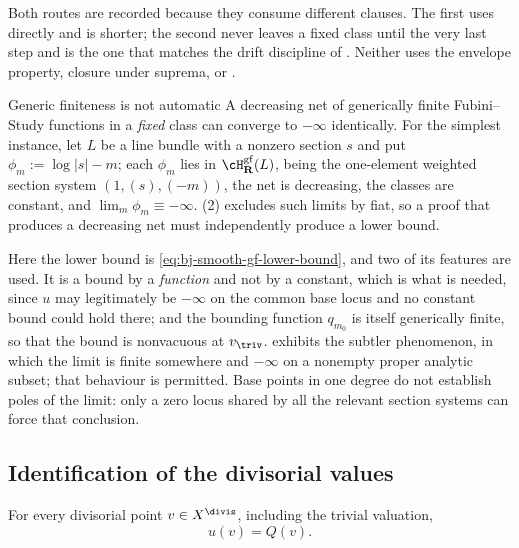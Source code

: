 Both routes are recorded because they consume different clauses.  The first
uses  directly and is shorter; the second never leaves a
fixed class until the very last step and is the one that matches the drift
discipline of .  Neither uses the
envelope property, closure under suprema, or
.

\begin{warning}{Generic finiteness is not automatic}
\label{warn:ch40-generic-finiteness}
A decreasing net of generically finite Fubini--Study functions in a
\emph{fixed} class can converge to $-\infty$ identically.  For the
simplest instance, let $L$ be a line bundle with a nonzero section $s$
and put $\phi_m:=\log|s|-m$; each $\phi_m$ lies in
$\cH^{\mathrm{gf}}_{\mathbf R}(L)$, being the one-element weighted section
system $(1,(s),(-m))$, the net is decreasing, the classes are constant, and
$\lim_m\phi_m\equiv-\infty$.  (2) excludes such limits by
fiat, so a proof that produces a decreasing net must independently produce a
lower bound.

Here the lower bound is \eqref{eq:bj-smooth-gf-lower-bound}, and two of its
features are used.  It is a bound by a \emph{function} and not by a
constant, which is what is needed, since $u$ may legitimately be
$-\infty$ on the common base locus and no constant bound could hold there;
and the bounding function $q_{m_0}$ is itself generically finite, so that
the bound is nonvacuous at $v_{\triv}$.  
exhibits the subtler phenomenon, in which the limit is finite somewhere and
$-\infty$ on a nonempty proper analytic subset; that behaviour is
permitted.  Base points in one degree do not establish poles of the
limit: only a zero locus shared by all the relevant section systems can
force that conclusion.
\end{warning}

\subsection{Identification of the divisorial values}
\label{sec:ch40-divisorial-identification}

\begin{proposition}\label{prop:bj-smooth-divisorial-identification}
For every divisorial point $v\in X^{\divis}$, including the trivial
valuation,
\[
                              u(v)=Q(v).
\tag{40.25}\label{eq:bj-smooth-divisorial-identification}
\]
\end{proposition}

